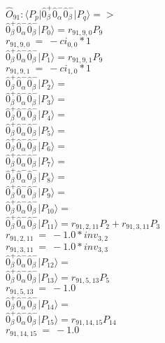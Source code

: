 \documentclass[14pt]{article}
\begin{document}
    $\hat{O}_{91}:  \langle{P_p}\vert \hat{0}_{\beta}^{+}\hat{0}_{\alpha}^{-}\hat{0}_{\beta}^{-} \vert{P_q}\rangle => $ \\ 
    $ \hat{0}_{\beta}^{+}\hat{0}_{\alpha}^{-}\hat{0}_{\beta}^{-} \vert{P_{0}}\rangle = {r}_{91,9,0}P_{9} $ \\ 
    ${r}_{91,9,0}\ =\ -{ci}_{0,0}*1 $ \\ 
    $ \hat{0}_{\beta}^{+}\hat{0}_{\alpha}^{-}\hat{0}_{\beta}^{-} \vert{P_{1}}\rangle = {r}_{91,9,1}P_{9} $ \\ 
    ${r}_{91,9,1}\ =\ -{ci}_{1,0}*1 $ \\ 
    $ \hat{0}_{\beta}^{+}\hat{0}_{\alpha}^{-}\hat{0}_{\beta}^{-} \vert{P_{2}}\rangle =  $ \\ 
    $ \hat{0}_{\beta}^{+}\hat{0}_{\alpha}^{-}\hat{0}_{\beta}^{-} \vert{P_{3}}\rangle =  $ \\ 
    $ \hat{0}_{\beta}^{+}\hat{0}_{\alpha}^{-}\hat{0}_{\beta}^{-} \vert{P_{4}}\rangle =  $ \\ 
    $ \hat{0}_{\beta}^{+}\hat{0}_{\alpha}^{-}\hat{0}_{\beta}^{-} \vert{P_{5}}\rangle =  $ \\ 
    $ \hat{0}_{\beta}^{+}\hat{0}_{\alpha}^{-}\hat{0}_{\beta}^{-} \vert{P_{6}}\rangle =  $ \\ 
    $ \hat{0}_{\beta}^{+}\hat{0}_{\alpha}^{-}\hat{0}_{\beta}^{-} \vert{P_{7}}\rangle =  $ \\ 
    $ \hat{0}_{\beta}^{+}\hat{0}_{\alpha}^{-}\hat{0}_{\beta}^{-} \vert{P_{8}}\rangle =  $ \\ 
    $ \hat{0}_{\beta}^{+}\hat{0}_{\alpha}^{-}\hat{0}_{\beta}^{-} \vert{P_{9}}\rangle =  $ \\ 
    $ \hat{0}_{\beta}^{+}\hat{0}_{\alpha}^{-}\hat{0}_{\beta}^{-} \vert{P_{10}}\rangle =  $ \\ 
    $ \hat{0}_{\beta}^{+}\hat{0}_{\alpha}^{-}\hat{0}_{\beta}^{-} \vert{P_{11}}\rangle = {r}_{91,2,11}P_{2}+{r}_{91,3,11}P_{3} $ \\ 
    ${r}_{91,2,11}\ =\ -1.0*{inv}_{3,2} $ \\ 
    ${r}_{91,3,11}\ =\ -1.0*{inv}_{3,3} $ \\ 
    $ \hat{0}_{\beta}^{+}\hat{0}_{\alpha}^{-}\hat{0}_{\beta}^{-} \vert{P_{12}}\rangle =  $ \\ 
    $ \hat{0}_{\beta}^{+}\hat{0}_{\alpha}^{-}\hat{0}_{\beta}^{-} \vert{P_{13}}\rangle = {r}_{91,5,13}P_{5} $ \\ 
    ${r}_{91,5,13}\ =\ -1.0 $ \\ 
    $ \hat{0}_{\beta}^{+}\hat{0}_{\alpha}^{-}\hat{0}_{\beta}^{-} \vert{P_{14}}\rangle =  $ \\ 
    $ \hat{0}_{\beta}^{+}\hat{0}_{\alpha}^{-}\hat{0}_{\beta}^{-} \vert{P_{15}}\rangle = {r}_{91,14,15}P_{14} $ \\ 
    ${r}_{91,14,15}\ =\ -1.0 $ \\ 
    
\end{document}
